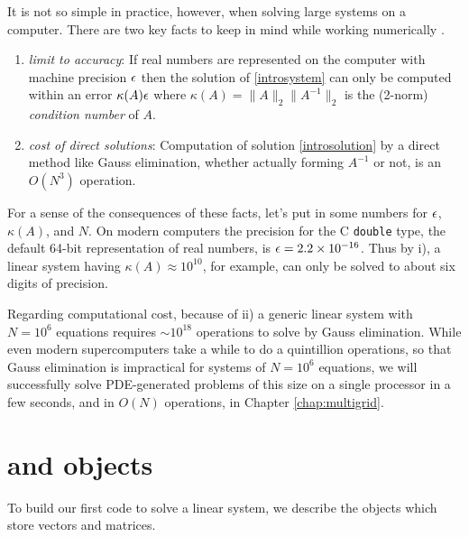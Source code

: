 It is not so simple in practice, however, when solving large systems on a computer.  There are two key facts to keep in mind while working numerically  \citep{TrefethenBau}.
\renewcommand{\labelenumi}{\roman{enumi})}
\begin{enumerate}
\item \emph{limit to accuracy}:  If real numbers are represented on the computer with machine precision $\epsilon$ then the solution of \eqref{introsystem} can only be computed within an error $\kappa(A) \epsilon$ where $\kappa(A) = \|A\|_2 \|A^{-1}\|_2$ is the (2-norm) \emph{condition number} of $A$.
\item \emph{cost of direct solutions}:  Computation of solution \eqref{introsolution} by a direct method like Gauss elimination, whether actually forming $A^{-1}$ or not, is an $O(N^3)$ operation.
\end{enumerate}

For a sense of the consequences of these facts, let's put in some numbers for $\epsilon$, $\kappa(A)$, and $N$.  On modern computers the precision for the C \texttt{double} type, the default 64-bit representation of real numbers, is $\epsilon = 2.2 \times 10^{-16}$.  Thus by i), a linear system having $\kappa(A) \approx 10^{10}$, for example, can only be solved to about six digits of precision.

Regarding computational cost, because of ii) a generic linear system with $N=10^6$ equations requires $\sim 10^{18}$ operations to solve by Gauss elimination.  While even modern supercomputers take a while to do a quintillion operations, so that Gauss elimination is impractical for systems of $N=10^6$ equations, we will successfully solve PDE-generated problems of this size on a single processor in a few seconds, and in $O(N)$ operations, in Chapter \ref{chap:multigrid}.


\section{\PETSc \pVec and \pMat objects}

To build our first \PETSc code to solve a linear system, we describe the \PETSc objects which store vectors and matrices.

